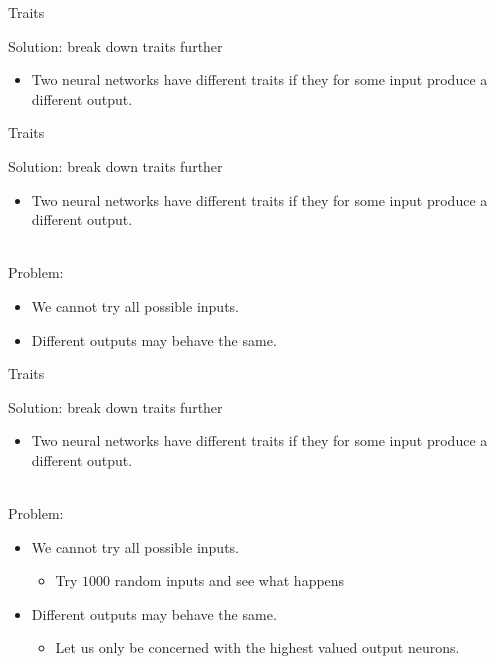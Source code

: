 \begin{frame}{Traits}

  Solution: break down traits further
  \begin{itemize}
	\item Two neural networks have different traits if they for some input produce a different output.
  \end{itemize}

\end{frame}

\begin{frame}{Traits}

  Solution: break down traits further
  \begin{itemize}
	\item Two neural networks have different traits if they for some input produce a different output.
  \end{itemize}\\
    \vspace{30pt}
  Problem:
  \begin{itemize}
	\item We cannot try all possible inputs.
	\item Different outputs may behave the same.
  \end{itemize}

\end{frame}

\begin{frame}{Traits}

  Solution: break down traits further
  \begin{itemize}
	\item Two neural networks have different traits if they for some input produce a different output.
  \end{itemize}\\
    \vspace{30pt}
  Problem:
  \begin{itemize}
	\item We cannot try all possible inputs.
	 \begin{itemize}
	  \item Try $1000$ random inputs and see what happens
	    \end{itemize}
	\item Different outputs may behave the same.
		  \begin{itemize}
	       \item Let us only be concerned with the highest valued output neurons.
	    \end{itemize}
  \end{itemize}

\end{frame}

